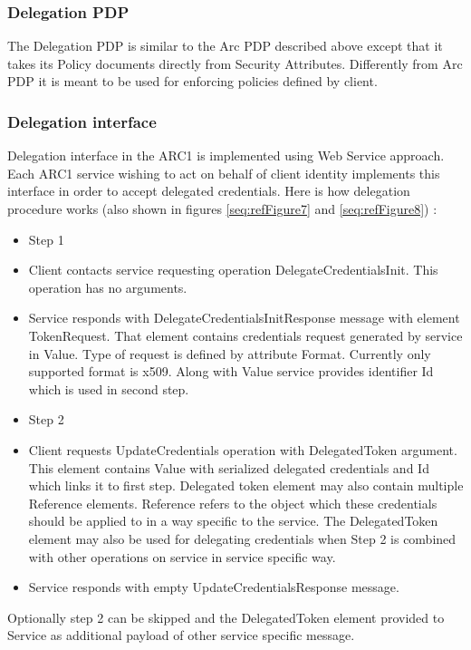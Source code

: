 \documentclass[a4paper]{article}
\newcommand\liststyleWWviiiNumix{%
\renewcommand\labelitemi{[F0B7?]}
\renewcommand\labelitemii{{}-}
\renewcommand\labelitemiii{${\blacksquare}$}
\renewcommand\labelitemiv{[F06C?]}
}
\newcommand\liststyleWWviiiNumx{%
\renewcommand\labelitemi{[F0B7?]}
\renewcommand\labelitemii{[F081?]}
\renewcommand\labelitemiii{${\blacksquare}$}
\renewcommand\labelitemiv{[F06C?]}
}
\newcounter{Figure}
\begin{document}
\subsubsection[Delegation PDP]{Delegation PDP}
\label{bkm:Ref204009695}{\upshape\color{black}
The Delegation PDP is similar to the Arc PDP described above except that
it takes it{\textquotesingle}s Policy documents directly from Security
Attributes. Differently from Arc PDP it is meant to be used for
enforcing policies defined by client.}

\subsubsection[Delegation interface]{Delegation interface}
\label{bkm:Ref204009766}{\upshape\color{black}
Delegation interface in the ARC1 is implemented using Web Service
approach. Each ARC1 service wishing to act on behalf of client identity
implements this interface in order to accept delegated credentials.
Here is how delegation procedure works (also shown in figures
\ref{seq:refFigure7} and \ref{seq:refFigure8}) :}

\liststyleWWviiiNumix
\begin{itemize}
\item {\color{black}
Step 1}
\item {\color{black}
Client contacts service requesting operation DelegateCredentialsInit.
This operation has no arguments.}
\item {\color{black}
Service responds with DelegateCredentialsInitResponse message with
element TokenRequest. That element contains credentials request
generated by service in Value. Type of request is defined by attribute
Format. Currently only supported format is x509. Along with Value
service provides identifier Id which is used in second step.}
\end{itemize}
\liststyleWWviiiNumx
\begin{itemize}
\item {\color{black}
Step 2}
\item {\color{black}
Client requests UpdateCredentials operation with DelegatedToken
argument. This element contains Value with serialized delegated
credentials and Id which links it to first step. Delegated token
element may also contain multiple Reference elements. Reference refers
to the object which these credentials should be applied to in a way
specific to the service. The DelegatedToken element may also be used
for delegating credentials when Step 2 is combined with other
operations on service in service specific way.}
\item {\color{black}
Service responds with empty UpdateCredentialsResponse message.}
\end{itemize}
{\color{black}
Optionally step 2 can be skipped and the DelegatedToken element provided
to Service as additional payload of other service specific message. }
\end{document}
